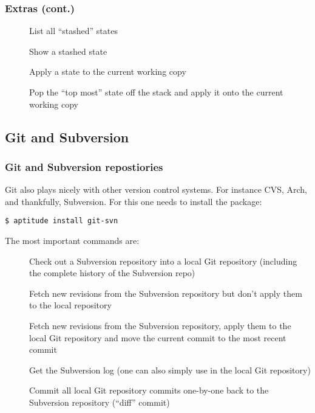 \begin{frame}[fragile]
\frametitle{Extras (cont.)}

\begin{description}
\item[] List all \enquote{stashed} states
\item[] Show a stashed state
\item[] Apply a state to the current working copy
\item[] Pop the \enquote{top most} state off the
    stack and apply it onto the current working copy
\end{description}


\end{frame}

\subsection{Git and Subversion}

\begin{frame}[fragile]
\frametitle{Git and Subversion repostiories}

Git also plays nicely with other version control systems.  For instance CVS,
Arch, and thankfully, Subversion.  For this one needs to install the
 package:
\begin{lstlisting}
$ aptitude install git-svn
\end{lstlisting}

The most important commands are:
\begin{description}
    \item[] Check out a Subversion repository into a
	local Git repository (including the complete history of the
	Subversion repo)
    \item[] Fetch new revisions from the Subversion
	repository but don't apply them to the local repository
    \item[] Fetch new revisions from the Subversion
	repository, apply them to the local Git repository and move the
	current commit to the most recent commit
    \item[] Get the Subversion log (one can also simply
	use  in the local Git repository)
    \item[] Commit all local Git repository commits
	one-by-one back to the Subversion repository (\enquote{diff} commit)
\end{description}

\end{frame}

